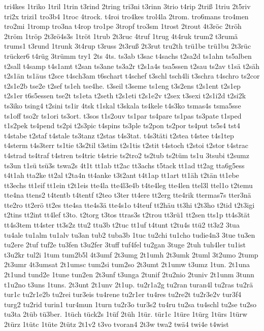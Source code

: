{tri4kes
1triko
1tril
1trin
t3rind
2tring
tri3ni
t3rinn
3trio
t4rip
2triß
1triu
2t5riv
tri2x
trizi1
tro3b4
1troc
4trock.
t4roi
tro4kes
trol4la
2trom.
tro6mans
tro4men
tro2mi
1tromp
tro3na
t4rop
tro1pe
3tropf
tro3sm
1trost
2trout
4t3röc
2tröh
2tröm
1tröp
2t3rö4s3s
1tröt
1trub
2t3ruc
4truf
1trug
4t4ruk
trum2
t3rumä
trums1
t3rund
1trunk
3t4rup
t3russ
2t3ruß
2t3rut
tru2th
trü1be
trü1bu
2t3rüc
trücker6
t4rüg
3trümm
try1
2ts
4ts.
ts3ab
t3sac
t4sachs
t2sa2d
ts1ahn
ts5alben
t2sall
t4samp
t4s1amt
t2san
ts3ane
ts3a2r
t2s1a4s
tsa5ssen
t2sau
ts2av
t1sä
t2säh
t2s1än
ts1äus
t2sce
t4sch3am
t6schart
t4schef
t3schl
tsch4li
t3schra
t4schro
ts2cor
t2s1e2b
tse2e
t2sef
ts1eh
tse4he.
t3seil
t3seme
ts1eng
t3s2ens
t2s1ent
t2s1ep
t2s1er
t6s5essen
tse2t
ts1eta
t2seth
t2s1eti
t2s1e2v
t2sex
t3sexi
t2s1i2d
t2si2k
ts3iko
tsing4
t2sini
ts1ir
4tsk
t1skal
t3skala
ts4kele
t4s3ko
tsmas4s
tsma5sse
ts1off
tso2r
ts1ori
ts3ort.
t3sos
t1s2ouv
ts1par
ts4pare
ts1pas
ts3pate
t1sped
t1s2pek
ts4pend
ts2pi
t2s3pic
t4spins
ts3ple
ts2pon
ts2por
ts4put
ts5s4
tst4
t4stabe
t2staf
t4stale
ts3tanz
t2stas
t4s3tat.
t4s3täti
t2stea
t4stee
t4s1tep
t4sterm
t4s3terr
ts1tie
t3s2til
t3stim
t2s1tis
t2stit
t4stoch
t2stoi
t2stor
t4strac
t4strad
ts4traf
t4stren
ts4tric
t4strie
ts2tro2
ts2tub
ts2tüm
ts1u
3tsubi
t2sumz
ts3un
t1sü
tsü3s
tswa2s
4t1t
tt1ab
tt2ac
tt3achs
t5tack
tt1ad
tt2ag
tta6g5ess
t4t1ah
tta2ke
tt2al
t2ta4n
tt4anke
t3t2ant
t4t1ap
tt1art
tt1äh
t2tän
tt1ebe
tt3echs
tt1eif
tt1ein
t2t1eis
tte4la
tte4l3e4b
t4te4leg
tte4len
ttel3l
ttel1o
t2temu
tte4na
ttens2
t4tentb
t4tentf
t2teo
t3ter
tt4ere
tt2erg
tte4rik
ttermas7s
tter3nä
tte2ro
tt2erö
tt2es
tte4sa
tte4s3ä
tte4s1o
t4teuf
tt2häu
tt3hi
t2t3ho
t2tid
t2t3igi
t2tins
tt2int
tt4lef
t3to.
t2torg
t3tos
ttras3s
t2trou
tt3rü1
tt2sen
tts1p
tt4s3tät
tt4s3tem
tt4ster
tt3s2z
ttu2
ttu3b
t2tuc
tt1uf
t4tunt
t2tu4s
ttü2
tt3z2
3tua
tu4ale
tu1alm
tu1alv
tu3an
tub2
tuba3b
1tuc
tu2chi
tu1cho
tudie4n3
3tue
tu3en
tu2ere
2tuf
tuf2e
tu3fen
t3u2fer
3tuff
tuf4fel
tu2gan
3tuge
2tuh
tuh4ler
tu1ist
t3u2kr
tul2i
1tum
tum2b5l
4t3umf
2t3umg
2t1umh
2t3umk
2tuml
3t2umo
2tump
2t3umr
4t3umsat
2t1umsc
tum2si
tum2so
2t3umt
2t1umw
t3umz
1tun.
2t1una
2t1und
tund2e
1tune
tun2en
2t3unf
t3unga
2tunif
2tu2nio
2tuniv
2t1unm
3tunn
t1u2no
t3uns
1tuns.
2t3unt
2t1unv
2t1up.
tu2r1a2g
tu2ran
turan4l
tu2ras
tu2rä
tur1c
tu2r1e2b
tu2rei
tur3eis
tu4rene
tu2r1er
tu4res
tu2re2t
tu2r3e2v
tur3f4
turg2
tu2rid
turin1
tur4mun
1turn
tu2r3o
tur3s2
tu4ru
tu2sa
tu4schl
tu2se
tu2so
tu3ta
2tüb
tü3ber.
1tüch
tück2s
1tüf
2tüh
1tür.
tür1c
1türe
1türg
1türs
1türw
2türz
1tütc
1tüte
2tütz
2t1v2
t3vo
tvoran4
2t3w
twa2
twä4
twi4e
t4wist
}

